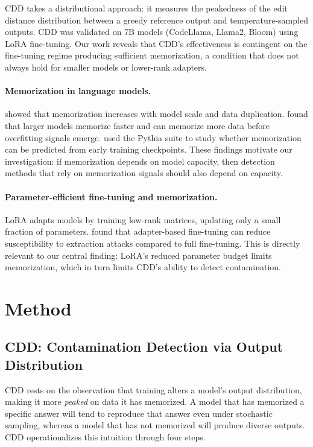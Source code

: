 \documentclass[11pt]{article}
\begin{document}
CDD \citep{dong2024contamination} takes a distributional approach: it measures the peakedness of the edit distance distribution between a greedy reference output and temperature-sampled outputs. CDD was validated on 7B models (CodeLlama, Llama2, Bloom) using LoRA fine-tuning. Our work reveals that CDD's effectiveness is contingent on the fine-tuning regime producing sufficient memorization, a condition that does not always hold for smaller models or lower-rank adapters.

\paragraph{Memorization in language models.} \citet{carlini2023quantifying} showed that memorization increases with model scale and data duplication. \citet{tirumala2022memorization} found that larger models memorize faster and can memorize more data before overfitting signals emerge. \citet{biderman2023emergent} used the Pythia suite to study whether memorization can be predicted from early training checkpoints. These findings motivate our investigation: if memorization depends on model capacity, then detection methods that rely on memorization signals should also depend on capacity.

\paragraph{Parameter-efficient fine-tuning and memorization.} LoRA \citep{hu2022lora} adapts models by training low-rank matrices, updating only a small fraction of parameters. \citet{mireshghallah2022empirical} found that adapter-based fine-tuning can reduce susceptibility to extraction attacks compared to full fine-tuning. This is directly relevant to our central finding: LoRA's reduced parameter budget limits memorization, which in turn limits CDD's ability to detect contamination.


\section{Method}

\subsection{CDD: Contamination Detection via Output Distribution}

CDD \citep{dong2024contamination} rests on the observation that training alters a model's output distribution, making it more \emph{peaked} on data it has memorized. A model that has memorized a specific answer will tend to reproduce that answer even under stochastic sampling, whereas a model that has not memorized will produce diverse outputs. CDD operationalizes this intuition through four steps.
\end{document}
